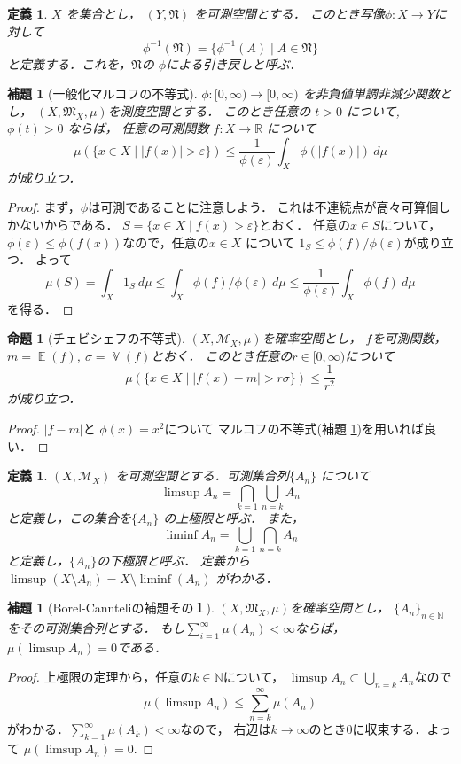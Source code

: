 \documentclass[leqno, a4paper, 12pt]{jsarticle}
\newtheorem{prop}[thm]{命題}
\newtheorem{lem}[thm]{補題}
\newtheorem{df}[thm]{定義}
\newcommand{\nn}{\mathbb{N}}
\newcommand{\rr}{\mathbb{R}}
\newcommand{\ep}{\varepsilon}
\DeclareMathOperator{\mean}{\mathbb{E}}
\DeclareMathOperator{\varian}{\mathbb{V}}
\begin{document}
\begin{df}
$X$
を集合とし，
$(Y, \mathfrak{N})$
を可測空間とする．
このとき写像$\phi:X\to Y$に対して
\[
\phi^{-1}(\mathfrak{N})
=
\{\phi^{-1}(A)\mid A\in \mathfrak{N}\}
\]
と定義する．これを，$\mathfrak{N}$の
$\phi$による引き戻しと呼ぶ．
\end{df}



\begin{lem}[一般化マルコフの不等式]\label{lem:Markov}
$\phi: [0, \infty)\to [0, \infty)$
を非負値単調非減少関数とし，
$(X, \mathfrak{M}_X, \mu)$を測度空間とする．
このとき任意の
$t>0$
について,
$\phi(t)>0$
ならば，
任意の可測関数
$f: X\to \rr$
について
\[
\mu(\{x\in X\mid |f(x)|>\ep\})
\le \frac{1}{\phi(\ep)}
\int_X\phi(|f(x)|)\ d\mu
\]
が成り立つ．
\end{lem}
\begin{proof}
まず，$\phi$は可測であることに注意しよう．
これは不連続点が高々可算個しかないからである．
$S=\{x\in X\mid f(x)>\ep\}$とおく．
任意の$x\in S$について，$\phi(\ep)\le \phi(f(x))$なので，任意の$x\in X$
について
$1_S\le \phi(f)/\phi(\ep)$が成り立つ．
よって
\[
\mu(S)=\int_X1_S\ d\mu\le \int_X \phi(f)/\phi(\ep)\ d\mu\le \frac{1}{\phi(\ep)}\int_X\phi(f)\ d\mu
\]
を得る．
\end{proof}


\begin{prop}[チェビシェフの不等式]\label{prop:che}
$(X, \mathcal{M}_X, \mu)$を確率空間とし，
$f$を可測関数，
$m=\mean(f)$, 
$\sigma=\varian(f)$とおく．
このとき任意の$r\in [0, \infty)$について
\[
\mu(\{x\in X\mid |f(x)-m|>r\sigma\})\le \frac{1}{r^2}
\]
が成り立つ．
\end{prop}
\begin{proof}
$|f-m|$と
$\phi(x)=x^2$について
マルコフの不等式(補題 \ref{lem:Markov})を用いれば良い．
\end{proof}


\begin{df}
$(X, \mathcal{M}_X)$
を可測空間とする．可測集合列$\{A_n\}$
について
\[
\limsup A_n=\bigcap_{k=1}\bigcup_{n=k}A_n
\]
と定義し，この集合を$\{A_n\}$
の上極限と呼ぶ．
また，
\[
\liminf A_n=\bigcup_{k=1}\bigcap_{n=k} A_n
\]
と定義し，$\{A_n\}$の下極限と呼ぶ．
定義から$\limsup(X\setminus A_n)=X\setminus \liminf(A_n)$
がわかる．
\end{df}

\begin{lem}[Borel-Cannteliの補題その１]\label{lem:bc}
$(X, \mathfrak{M}_X, \mu)$を確率空間とし，
$\{A_n\}_{n\in \nn}$をその可測集合列とする．
もし$\sum_{i=1}^{\infty}\mu(A_n)<\infty$ならば，
$\mu(\limsup A_n)=0$である．
\end{lem}
\begin{proof}
上極限の定理から，任意の$k\in \nn$について，
$\limsup A_n\subset \bigcup_{n=k}A_n$なので
\[
\mu(\limsup A_n)\le \sum_{n=k}^{\infty}\mu(A_n)
\]
がわかる．$\sum_{k=1}^{\infty}\mu(A_k)<\infty$なので，
右辺は$k\to \infty$のとき$0$に収束する．よって
$\mu(\limsup A_n)=0$. 
\end{proof}
\end{document}
